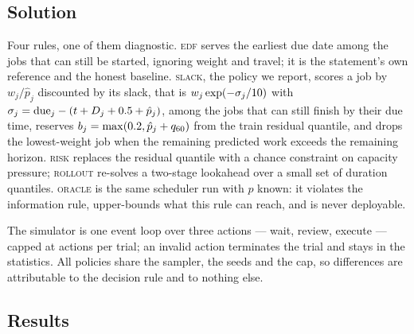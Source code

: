 \documentclass{swmcmthesis}
\begin{document}
\subsection{Solution}
\label{sec:p3sol}

Four rules, one of them diagnostic. \textsc{edf} serves the earliest due date among
the jobs that can still be started, ignoring weight and travel; it is the
statement's own reference and the honest baseline. \textsc{slack}, the policy we
report, scores a job by $w_j/\hat p_j$ discounted by its slack, that is
$w_j\exp(-\sigma_j/10)$ with
$\sigma_j=\text{due}_j-(t+D_j+0.5+\hat p_j)$, among the jobs that can
still finish by their due time, reserves
$b_j=\max(0.2,\hat p_j+q_{60})$ from the train residual quantile,
and drops the lowest-weight job when the remaining predicted work exceeds the
remaining horizon. \textsc{risk} replaces the residual quantile with a chance
constraint on capacity pressure; \textsc{rollout} re-solves a two-stage lookahead
over a small set of duration quantiles. \textsc{oracle} is the same scheduler run
with $p$ known: it violates the information rule, upper-bounds what this rule can reach, and is never
deployable.

The simulator is one event loop over three actions --- wait, review, execute ---
capped at \slotMaxActions{} actions per trial; an invalid action terminates the trial
and stays in the statistics. All policies share the sampler, the seeds and the cap,
so differences are attributable to the decision rule and to nothing else.

\subsection{Results}
\label{sec:p3res}
\end{document}
